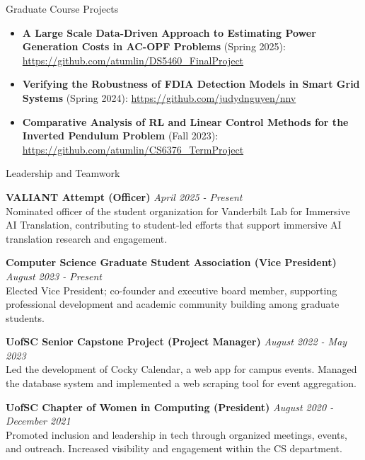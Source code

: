 \documentclass{resume}
\begin{document}
\begin{rSection}{Graduate Course Projects}
\begin{itemize}
    \item \textbf{A Large Scale Data-Driven Approach to Estimating Power Generation Costs in AC-OPF Problems} (Spring 2025): \url{https://github.com/atumlin/DS5460_FinalProject}
    \item \textbf{Verifying the Robustness of FDIA Detection Models in Smart Grid Systems} (Spring 2024): \url{https://github.com/judydnguyen/nnv}
    \item \textbf{Comparative Analysis of RL and Linear Control Methods for the Inverted Pendulum Problem} (Fall 2023): \url{https://github.com/atumlin/CS6376_TermProject}
\end{itemize}
\end{rSection}


\begin{rSection}{Leadership and Teamwork}

{\bf VALIANT Attempt (Officer)} \hfill {\em April 2025 - Present} \\
Nominated officer of the student organization for Vanderbilt Lab for Immersive AI Translation, contributing to student-led efforts that support immersive AI translation research and engagement.

{\bf Computer Science Graduate Student Association (Vice President)} \hfill {\em August 2023 - Present} \\
Elected Vice President; co-founder and executive board member, supporting professional development and academic community building among graduate students.

{\bf UofSC Senior Capstone Project (Project Manager)} \hfill {\em August 2022 - May 2023} \\
Led the development of Cocky Calendar, a web app for campus events. Managed the database system and implemented a web scraping tool for event aggregation.

{\bf UofSC Chapter of Women in Computing (President)} \hfill {\em August 2020 - December 2021} \\
Promoted inclusion and leadership in tech through organized meetings, events, and outreach. Increased visibility and engagement within the CS department.

\end{rSection}
\end{document}
